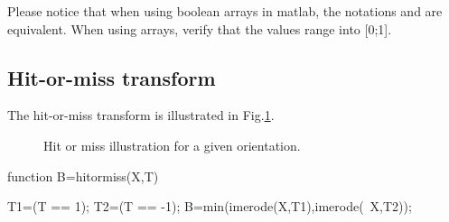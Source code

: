 \def\QRCODE{TB_IPR_TUT.IMG.binary_morphological_skeletonization_matlabqrcode.png}
\def\QRPAGE{http://www.iptutorials.science/tree/master/TB_IPR/TUT.IMG.binary_morphological_skeletonization/matlab}

\begin{mcomment}
\begin{mremark}
Please notice that when using boolean arrays in matlab, the notations  and  are equivalent. When using  arrays, verify that the values range into [0;1].
\end{mremark}
\end{mcomment}

\subsection{Hit-or-miss transform}
The hit-or-miss transform is illustrated in Fig.\ref{fig:morphological_skeleton:matlab:hitormiss}. 
\begin{figure}[htbp]
 \centering
 \hspace*{1cm}
 
 \caption{Hit or miss illustration for a given orientation.}
 \label{fig:morphological_skeleton:matlab:hitormiss}
\end{figure}
\begin{matlab}
function B=hitormiss(X,T)

T1=(T == 1);
T2=(T == -1);
B=min(imerode(X,T1),imerode(~X,T2));
\end{matlab}

